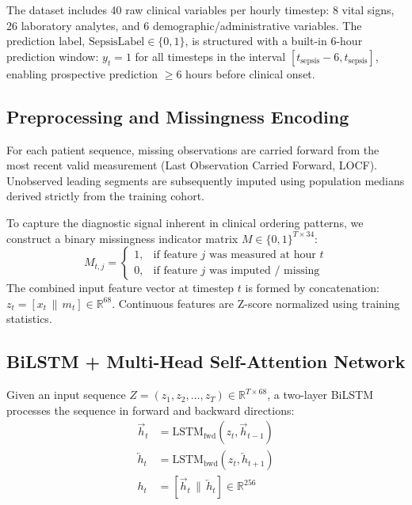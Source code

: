 \documentclass[conference]{IEEEtran}
\begin{document}
The dataset includes 40 raw clinical variables per hourly timestep: 8 vital signs, 26 laboratory analytes, and 6 demographic/administrative variables. The prediction label, $\text{SepsisLabel} \in \{0, 1\}$, is structured with a built-in 6-hour prediction window: $y_t = 1$ for all timesteps in the interval $[t_{\text{sepsis}} - 6, t_{\text{sepsis}}]$, enabling prospective prediction $\ge 6$ hours before clinical onset.

\subsection{Preprocessing and Missingness Encoding}
For each patient sequence, missing observations are carried forward from the most recent valid measurement (Last Observation Carried Forward, LOCF). Unobserved leading segments are subsequently imputed using population medians derived strictly from the training cohort.

To capture the diagnostic signal inherent in clinical ordering patterns, we construct a binary missingness indicator matrix $M \in \{0, 1\}^{T \times 34}$:
\begin{equation}
M_{t, j} = \begin{cases} 1, & \text{if feature } j \text{ was measured at hour } t \\ 0, & \text{if feature } j \text{ was imputed / missing} \end{cases}
\end{equation}
The combined input feature vector at timestep $t$ is formed by concatenation: $z_t = [x_t \,\|\, m_t] \in \mathbb{R}^{68}$. Continuous features are Z-score normalized using training statistics.

\subsection{BiLSTM + Multi-Head Self-Attention Network}
Given an input sequence $Z = (z_1, z_2, \dots, z_T) \in \mathbb{R}^{T \times 68}$, a two-layer BiLSTM processes the sequence in forward and backward directions:
\begin{align}
\overrightarrow{h}_t &= \text{LSTM}_{\text{fwd}}(z_t, \overrightarrow{h}_{t-1}) \\
\overleftarrow{h}_t &= \text{LSTM}_{\text{bwd}}(z_t, \overleftarrow{h}_{t+1}) \\
h_t &= [\overrightarrow{h}_t \,\|\, \overleftarrow{h}_t] \in \mathbb{R}^{256}
\end{align}
\end{document}
